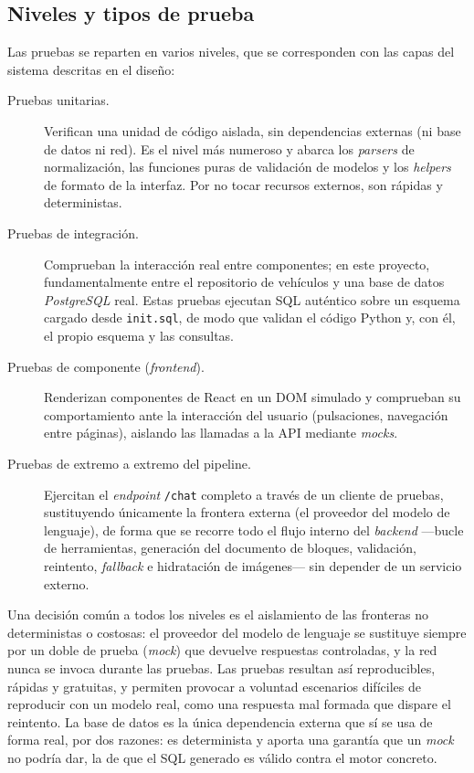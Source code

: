 \subsection{Niveles y tipos de prueba}
\label{sec:test-niveles}

Las pruebas se reparten en varios niveles, que se corresponden con las capas del
sistema descritas en el diseño:

\begin{description}
  \item[Pruebas unitarias.] Verifican una unidad de código aislada, sin
        dependencias externas (ni base de datos ni red). Es el nivel más numeroso
        y abarca los \emph{parsers} de normalización, las funciones puras de
        validación de modelos y los \emph{helpers} de formato de la interfaz. Por
        no tocar recursos externos, son rápidas y deterministas.

  \item[Pruebas de integración.] Comprueban la interacción real entre
        componentes; en este proyecto, fundamentalmente entre el repositorio de
        vehículos y una base de datos \emph{PostgreSQL} real. Estas pruebas
        ejecutan SQL auténtico sobre un esquema cargado desde
        \texttt{init.sql}, de modo que validan el código Python y, con él, el
        propio esquema y las consultas.

  \item[Pruebas de componente (\emph{frontend}).] Renderizan componentes de
        React en un DOM simulado y comprueban su comportamiento ante la
        interacción del usuario (pulsaciones, navegación entre páginas), aislando
        las llamadas a la API mediante \emph{mocks}.

  \item[Pruebas de extremo a extremo del pipeline.] Ejercitan el
        \emph{endpoint} \texttt{/chat} completo a través de un cliente de
        pruebas, sustituyendo únicamente la frontera externa (el proveedor del
        modelo de lenguaje), de forma que se recorre todo el flujo interno del
        \emph{backend} —bucle de herramientas, generación del documento de
        bloques, validación, reintento, \emph{fallback} e hidratación de
        imágenes— sin depender de un servicio externo.
\end{description}

Una decisión común a todos los niveles es el aislamiento de las fronteras no
deterministas o costosas: el proveedor del modelo de lenguaje se sustituye
siempre por un doble de prueba (\emph{mock}) que devuelve respuestas controladas,
y la red nunca se invoca durante las pruebas. Las pruebas resultan así
reproducibles, rápidas y gratuitas, y permiten provocar a voluntad escenarios
difíciles de reproducir con un modelo real, como una respuesta mal formada que
dispare el reintento. La base de datos es la única dependencia externa que sí se
usa de forma real, por dos razones: es determinista y aporta una garantía que un
\emph{mock} no podría dar, la de que el SQL generado es válido contra el motor
concreto.

